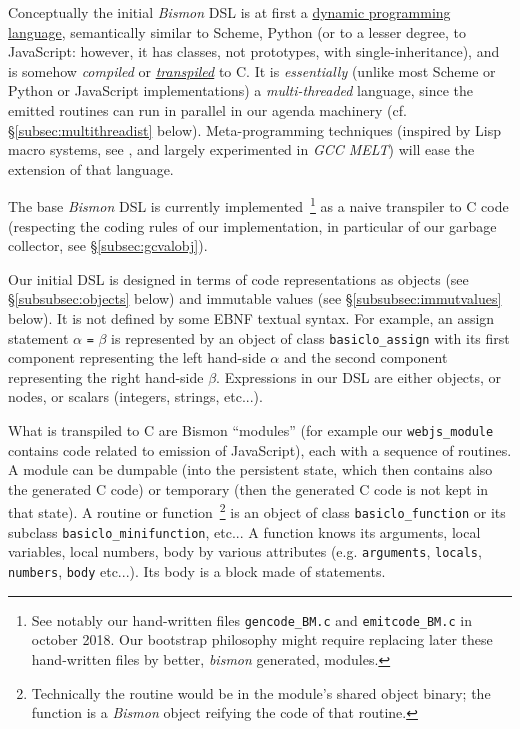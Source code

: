 Conceptually the initial \emph{Bismon} DSL  is at first a
\href{https://en.wikipedia.org/wiki/Dynamic\_programming\_language}{dynamic
  programming language}, semantically similar to Scheme, Python (or to
a lesser degree, to JavaScript: however, it has classes, not
prototypes, with single-inheritance), and is somehow \emph{compiled}
or
\href{https://en.wikipedia.org/wiki/Source-to-source\_compiler}{\emph{transpiled}}
to C. It is \emph{essentially} (unlike most Scheme or Python or
JavaScript implementations) a \emph{multi-threaded} language, since
the emitted routines can run in parallel in our agenda machinery
(cf. \S\ref{subsec:multithreadist} below). Meta-programming techniques
(inspired by Lisp macro systems, see \cite{Queinnec:1996:LSP}, and
largely experimented in \emph{GCC MELT}) will ease the extension of
that language.

The base \emph{Bismon} DSL is currently implemented~\footnote{See
  notably our hand-written files \texttt{gencode\_BM.c} and
  \texttt{emitcode\_BM.c} in october 2018. Our bootstrap philosophy
  might require replacing later these hand-written files by better,
  \emph{bismon} generated, modules.} as a naive transpiler to C code
(respecting the coding rules of our implementation, in particular of
our garbage collector, see \S\ref{subsec:gcvalobj}).

Our initial DSL is designed in terms of code representations as
objects (see \S\ref{subsubsec:objects} below) and immutable values (see
\S\ref{subsubsec:immutvalues} below). It is not defined by some EBNF
textual syntax. For example, an assign statement $\alpha$ \texttt{=} $\beta$
is represented by an object of class \texttt{basiclo\_assign}
     with its
first component representing the left hand-side $\alpha$ and the
second component representing the right hand-side $\beta$. Expressions
in our DSL are either objects, or nodes, or scalars (integers,
strings, etc...).


What is transpiled to C are Bismon ``modules'' (for example our
\texttt{webjs\_module} contains code related to emission of
JavaScript), each with a sequence of routines. A module can be
dumpable (into the persistent state, which then contains also the
generated C code) or temporary (then the generated C code is not kept
in that state). A routine or function~\footnote{Technically the
  routine would be in the module's shared object binary; the function
  is a \emph{Bismon} object reifying the code of that routine.}  is an
object of class \texttt{basiclo\_function}
or its subclass
\texttt{basiclo\_minifunction}, etc... A function knows its arguments,
local variables, local numbers, body by various attributes
(e.g. \texttt{arguments}, \texttt{locals}, \texttt{numbers},
\texttt{body} etc...). Its body is a block made of statements.

